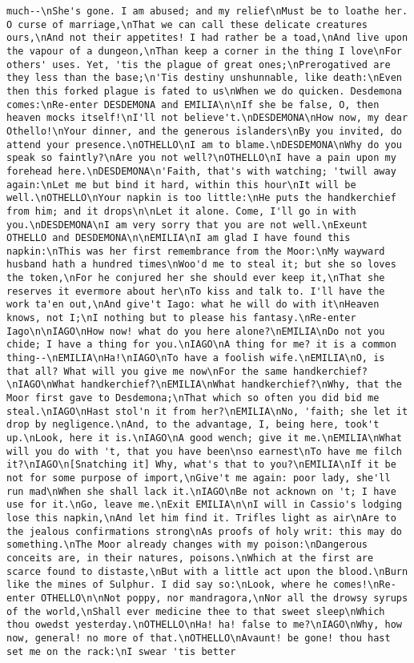 \begin{verbatim}
much--\nShe's gone. I am abused; and my relief\nMust be to loathe her. O curse of marriage,\nThat we can call these delicate creatures ours,\nAnd not their appetites! I had rather be a toad,\nAnd live upon the vapour of a dungeon,\nThan keep a corner in the thing I love\nFor others' uses. Yet, 'tis the plague of great ones;\nPrerogatived are they less than the base;\n'Tis destiny unshunnable, like death:\nEven then this forked plague is fated to us\nWhen we do quicken. Desdemona comes:\nRe-enter DESDEMONA and EMILIA\n\nIf she be false, O, then heaven mocks itself!\nI'll not believe't.\nDESDEMONA\nHow now, my dear Othello!\nYour dinner, and the generous islanders\nBy you invited, do attend your presence.\nOTHELLO\nI am to blame.\nDESDEMONA\nWhy do you speak so faintly?\nAre you not well?\nOTHELLO\nI have a pain upon my forehead here.\nDESDEMONA\n'Faith, that's with watching; 'twill away again:\nLet me but bind it hard, within this hour\nIt will be well.\nOTHELLO\nYour napkin is too little:\nHe puts the handkerchief from him; and it drops\n\nLet it alone. Come, I'll go in with you.\nDESDEMONA\nI am very sorry that you are not well.\nExeunt OTHELLO and DESDEMONA\n\nEMILIA\nI am glad I have found this napkin:\nThis was her first remembrance from the Moor:\nMy wayward husband hath a hundred times\nWoo'd me to steal it; but she so loves the token,\nFor he conjured her she should ever keep it,\nThat she reserves it evermore about her\nTo kiss and talk to. I'll have the work ta'en out,\nAnd give't Iago: what he will do with it\nHeaven knows, not I;\nI nothing but to please his fantasy.\nRe-enter Iago\n\nIAGO\nHow now! what do you here alone?\nEMILIA\nDo not you chide; I have a thing for you.\nIAGO\nA thing for me? it is a common thing--\nEMILIA\nHa!\nIAGO\nTo have a foolish wife.\nEMILIA\nO, is that all? What will you give me now\nFor the same handkerchief?\nIAGO\nWhat handkerchief?\nEMILIA\nWhat handkerchief?\nWhy, that the Moor first gave to Desdemona;\nThat which so often you did bid me steal.\nIAGO\nHast stol'n it from her?\nEMILIA\nNo, 'faith; she let it drop by negligence.\nAnd, to the advantage, I, being here, took't up.\nLook, here it is.\nIAGO\nA good wench; give it me.\nEMILIA\nWhat will you do with 't, that you have been\nso earnest\nTo have me filch it?\nIAGO\n[Snatching it] Why, what's that to you?\nEMILIA\nIf it be not for some purpose of import,\nGive't me again: poor lady, she'll run mad\nWhen she shall lack it.\nIAGO\nBe not acknown on 't; I have use for it.\nGo, leave me.\nExit EMILIA\n\nI will in Cassio's lodging lose this napkin,\nAnd let him find it. Trifles light as air\nAre to the jealous confirmations strong\nAs proofs of holy writ: this may do something.\nThe Moor already changes with my poison:\nDangerous conceits are, in their natures, poisons.\nWhich at the first are scarce found to distaste,\nBut with a little act upon the blood.\nBurn like the mines of Sulphur. I did say so:\nLook, where he comes!\nRe-enter OTHELLO\n\nNot poppy, nor mandragora,\nNor all the drowsy syrups of the world,\nShall ever medicine thee to that sweet sleep\nWhich thou owedst yesterday.\nOTHELLO\nHa! ha! false to me?\nIAGO\nWhy, how now, general! no more of that.\nOTHELLO\nAvaunt! be gone! thou hast set me on the rack:\nI swear 'tis better 
\end{verbatim}
